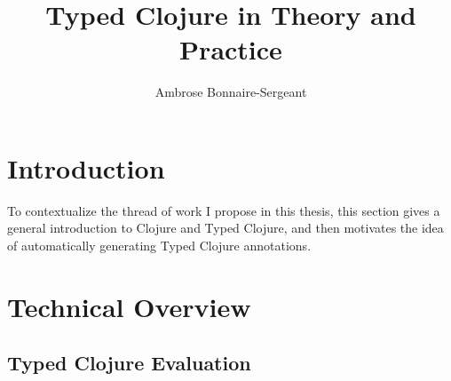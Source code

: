 \documentclass[9pt]{extarticle}
\title{Typed Clojure in Theory and Practice}
\author{Ambrose Bonnaire-Sergeant}
\begin{document}
\maketitle

\begin{abstract}
  
\end{abstract}

%
%

\section{Introduction}

To contextualize the thread of work I propose in this thesis, this section
gives a general introduction to Clojure and Typed Clojure, and
then motivates the idea of automatically generating Typed Clojure annotations.



%



\section{Technical Overview}







\subsection{Typed Clojure Evaluation}
\label{sec:casestudy}
\end{document}
